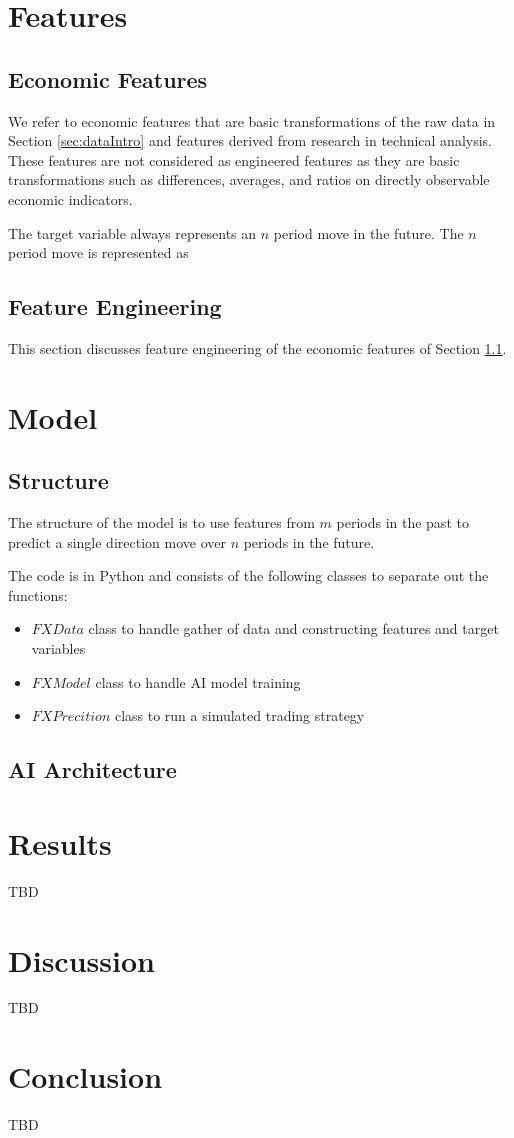 \documentclass{article}
\begin{document}
	\section{Features}
		
		\subsection{Economic Features} \label{sec:econFeat}
		We refer to economic features that are basic transformations of the raw data in Section \ref{sec:dataIntro} and features derived from research in technical analysis. These features are not considered as engineered features as they are basic transformations such as differences, averages, and ratios on directly observable economic indicators.
		
		The target variable always represents an $n$ period move in the future. The $n$ period move is represented as 
		
		\subsection{Feature Engineering}
		This section discusses feature engineering of the economic features of Section \ref{sec:econFeat}.

	\newpage
	\section{Model}
	
		\subsection{Structure}
		The structure of the model is to use features from $m$ periods in the past to predict a single direction move over $n$ periods in the future.
		
		The code is in Python and consists of the following classes to separate out the functions:
		
		\begin{itemize}
			\item $FXData$ class to handle gather of data and constructing features and target variables
			\item $FXModel$ class to handle AI model training
			\item $FXPrecition$ class to run a simulated trading strategy
		\end{itemize}
		
		\subsection{AI Architecture}
	
		
	\newpage
	\section{Results}
	TBD
	
	\newpage
	\section{Discussion}
	TBD
	
	\newpage
	\section{Conclusion}
	TBD
	
	\newpage
	
\end{document}
